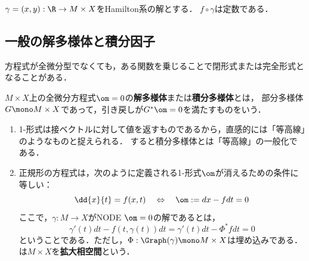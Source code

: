 \documentclass[uplatex,dvipdfmx]{jsreport}
\begin{document}
\begin{theorem}[Hamiltonianは積分である]
    $\gamma=(x,y):\R\to M\times X$をHamilton系の解とする．
    $f\circ\gamma$は定数である．
\end{theorem}

\subsection{一般の解多様体と積分因子}

\begin{tcolorbox}[colframe=ForestGreen, colback=ForestGreen!10!white,breakable,colbacktitle=ForestGreen!40!white,coltitle=black,fonttitle=\bfseries\sffamily,
title=]
    方程式が全微分型でなくても，ある関数を乗じることで閉形式または完全形式となることがある．
\end{tcolorbox}

\begin{definition}
    $M\times X$上の全微分方程式$\om=0$の\textbf{解多様体}または\textbf{積分多様体}とは，
    部分多様体$G\mono M\times X$であって，引き戻しが$G^*\om=0$を満たすものをいう．
\end{definition}
\begin{remarks}[積分曲線の概念の一般化]\mbox{}
    \begin{enumerate}
        \item 1-形式は接ベクトルに対して値を返すものであるから，直感的には「等高線」のようなものと捉えられる．
        すると積分多様体とは「等高線」の一般化である．
        \item 正規形の方程式は，次のように定義される1-形式$\om$が消えるための条件に等しい：
        \[\dd{x}{t}=f(x,t)\quad\Leftrightarrow\quad \om:=dx-fdt=0\]
        ここで，$\gamma:M\to X$がNODE $\om=0$の解であるとは，
        \[\gamma'(t)dt-f(t,\gamma(t))dt=\gamma'(t)dt-\Phi^*fdt=0\]
        ということである．ただし，$\Phi:\Graph(\gamma)\mono M\times X$は埋め込みである．
        \cite{Arnold-ODE}は$M\times X$を\textbf{拡大相空間}という．
    \end{enumerate}
\end{remarks}
\end{document}

